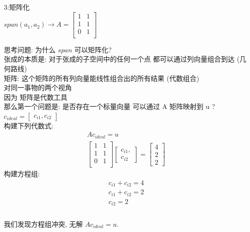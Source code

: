 \documentclass[12pt]{article}
\begin{document}
\begin{flushleft}
    3:矩阵化 \\
    $span(a_{1}, a_{2})  \rightarrow A  = \begin{bmatrix}
            1 & 1 \\
            1 & 1 \\
            0 & 1 \\
        \end{bmatrix}$

    思考问题: 为什么 $span$ 可以矩阵化?  \\
    张成的本质是: 对于张成的子空间中的任何一个点 都可以通过列向量组合到达 (几何路线) \\
    矩阵: 这个矩阵的所有列向量能线性组合出的所有结果 (代数组合) \\
    对同一事物的两个视角 \\

    因为 矩阵是代数工具  \\
    那么第一个问题是: 是否存在一个标量向量 可以通过 A 矩阵映射到 u ? \\

    $c_{ideal} = \begin{bmatrix}
            c_{i1},
            c_{i2}
        \end{bmatrix}$ \\
    构建下列代数式: \\
    \begin{align}
        Ac_{ideal} = u \\
        \begin{bmatrix}
            1 & 1 \\
            1 & 1 \\
            0 & 1 \\
        \end{bmatrix} \begin{bmatrix}
                          c_{i1}, \\
                          c_{i2}
                      \end{bmatrix} =  \begin{bmatrix}
                                           4 \\
                                           2 \\
                                           2
                                       \end{bmatrix}
    \end{align}
    构建方程组: \\
    \begin{align}
        c_{i1} + c_{i2} = 4 \\
        c_{i1} + c_{i2} = 2 \\
        c_{i2} = 2          \\
    \end{align} \\
    我们发现方程组冲突, 无解 $Ac_{ideal} = u$. \\


\end{flushleft}
\end{document}
